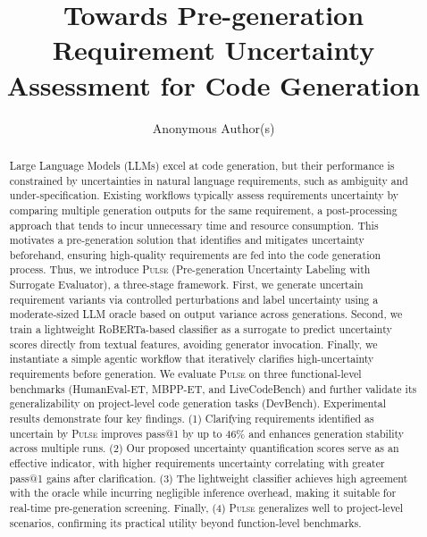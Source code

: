 \documentclass[10pt,conference]{IEEEtran}
\begin{document}
\title{Towards Pre-generation Requirement Uncertainty Assessment for Code Generation}
\author{Anonymous Author(s)}

\maketitle

\begin{abstract}
Large Language Models (LLMs) excel at code generation, but their performance is constrained by uncertainties in natural language requirements, such as ambiguity and under-specification. Existing workflows typically assess requirements uncertainty by comparing multiple generation outputs for the same requirement, a post-processing approach that tends to incur unnecessary time and resource consumption. This motivates a pre-generation solution that identifies and mitigates uncertainty beforehand, ensuring high-quality requirements are fed into the code generation process.
Thus, we introduce \textsc{Pulse} (Pre-generation Uncertainty Labeling with Surrogate Evaluator), a three-stage framework. First, we generate uncertain requirement variants via controlled perturbations and label uncertainty using a moderate-sized LLM oracle based on output variance across generations. Second, we train a lightweight RoBERTa-based classifier as a surrogate to predict uncertainty scores directly from textual features, avoiding generator invocation. Finally, we instantiate a simple agentic workflow that iteratively clarifies high-uncertainty requirements before generation. We evaluate \textsc{Pulse} on three functional-level benchmarks (HumanEval-ET, MBPP-ET, and LiveCodeBench) and further validate its generalizability on project-level code generation tasks (DevBench). Experimental results demonstrate four key findings. (1) Clarifying requirements identified as uncertain by \textsc{Pulse} improves pass@1 by up to 46\% and enhances generation stability across multiple runs. (2) Our proposed uncertainty quantification scores serve as an effective indicator, with higher requirements uncertainty correlating with greater pass@1 gains after clarification. (3) The lightweight classifier achieves high agreement with the oracle while incurring negligible inference overhead, making it suitable for real-time pre-generation screening. Finally, (4) \textsc{Pulse} generalizes well to project-level scenarios, confirming its practical utility beyond function-level benchmarks.

\end{abstract}
\end{document}

